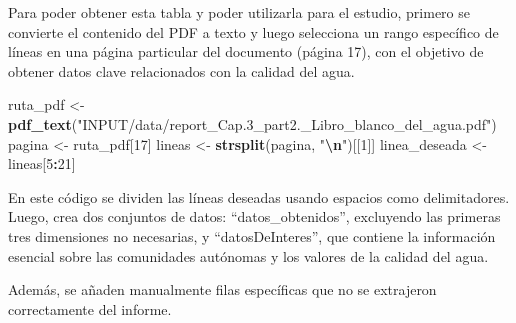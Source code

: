 \documentclass[
]{article}
\newenvironment{Shaded}{\begin{snugshade}}{\end{snugshade}}
\newcommand{\DecValTok}[1]{\textcolor[rgb]{0.00,0.00,0.81}{#1}}
\newcommand{\FunctionTok}[1]{\textcolor[rgb]{0.13,0.29,0.53}{\textbf{#1}}}
\newcommand{\NormalTok}[1]{#1}
\newcommand{\OtherTok}[1]{\textcolor[rgb]{0.56,0.35,0.01}{#1}}
\newcommand{\SpecialCharTok}[1]{\textcolor[rgb]{0.81,0.36,0.00}{\textbf{#1}}}
\newcommand{\StringTok}[1]{\textcolor[rgb]{0.31,0.60,0.02}{#1}}
\begin{document}
Para poder obtener esta tabla y poder utilizarla para el estudio,
primero se convierte el contenido del PDF a texto y luego selecciona un
rango específico de líneas en una página particular del documento
(página 17), con el objetivo de obtener datos clave relacionados con la
calidad del agua.

\begin{Shaded}
\begin{Highlighting}[]
\NormalTok{ruta\_pdf }\OtherTok{\textless{}{-}} \FunctionTok{pdf\_text}\NormalTok{(}\StringTok{"INPUT/data/report\_Cap.3\_part2.\_Libro\_blanco\_del\_agua.pdf"}\NormalTok{)}
\NormalTok{pagina }\OtherTok{\textless{}{-}}\NormalTok{ ruta\_pdf[}\DecValTok{17}\NormalTok{]}
\NormalTok{lineas }\OtherTok{\textless{}{-}} \FunctionTok{strsplit}\NormalTok{(pagina, }\StringTok{"}\SpecialCharTok{\textbackslash{}n}\StringTok{"}\NormalTok{)[[}\DecValTok{1}\NormalTok{]]}
\NormalTok{linea\_deseada }\OtherTok{\textless{}{-}}\NormalTok{ lineas[}\DecValTok{5}\SpecialCharTok{:}\DecValTok{21}\NormalTok{] }
\end{Highlighting}
\end{Shaded}

En este código se dividen las líneas deseadas usando espacios como
delimitadores. Luego, crea dos conjuntos de datos: ``datos\_obtenidos'',
excluyendo las primeras tres dimensiones no necesarias, y
``datosDeInteres'', que contiene la información esencial sobre las
comunidades autónomas y los valores de la calidad del agua.

Además, se añaden manualmente filas específicas que no se extrajeron
correctamente del informe.
\end{document}

